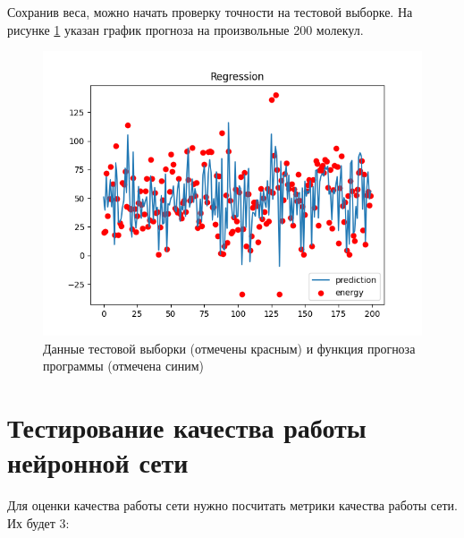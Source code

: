 Сохранив веса, можно начать проверку точности на тестовой выборке. На рисунке \ref{fig:6} указан график прогноза на произвольные 200 молекул. 
\begin{figure}[!h] 
  \center
  \includegraphics [scale=0.9] {img/regression.png}
  \caption{Данные тестовой выборки (отмечены красным) и функция прогноза программы (отмечена синим)} 
  \label{fig:6}  
\end{figure}
\section{Тестирование качества работы нейронной сети}
Для оценки качества работы сети нужно посчитать метрики качества работы сети. Их будет 3:

